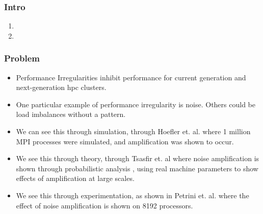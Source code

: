 \begin{frame}
\frametitle{Intro}
\begin{enumerate} 
\item \tiny 
\item \tiny 
\end{enumerate} 
\end{frame}


\begin{frame}
\frametitle{ Problem} 
\begin{itemize}
\item \tiny Performance Irregularities inhibit performance for current generation and next-generation hpc clusters. \\ 
\item \tiny One particular example of performance irregularity is noise. Others could be load imbalances without a pattern. \\ 
\item \tiny We can see this through simulation, through Hoefler et. al. where 1 million MPI processes were simulated, and amplification was shown to occur. \\ 
\item \tiny We see this through theory, through Tsasfir et. al where noise amplification is shown through probabilistic analysis ,  using real machine parameters to show effects of amplification at large scales. \\
\item \tiny We see this through experimentation, as shown in Petrini et. al.  where the effect of noise amplification is shown on 8192 processors.  \\
\end{itemize} 
\end{frame}

